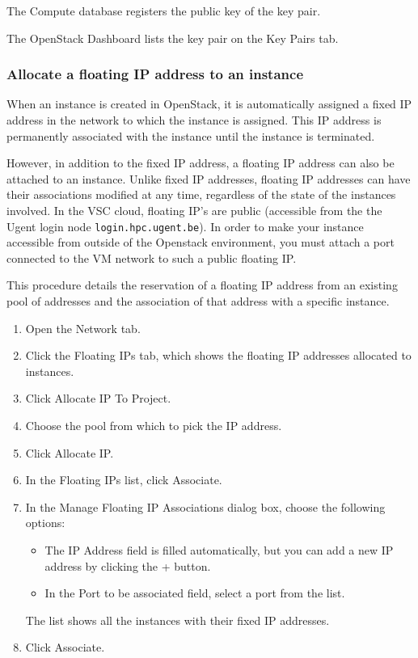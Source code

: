 The Compute database registers the public key of the key pair.

The \gls{OpenStack Dashboard} lists the key pair on the Key Pairs tab.

\subsubsection{Allocate a floating IP address to an instance}\label{allocate-a-floating-ip-address-to-an-instance}
When an instance is created in \gls{OpenStack}, it is automatically
assigned a fixed IP address in the network to which the instance is
assigned. This IP address is permanently associated with the instance
until the instance is terminated.

However, in addition to the fixed IP address, a floating IP address
can also be attached to an instance.  Unlike fixed IP addresses,
floating IP addresses can have their associations modified at any
time, regardless of the state of the instances involved.  In the VSC
cloud, floating IP's are public (accessible from the the Ugent login
node \lstinline{login.hpc.ugent.be}).  In order to make your instance
accessible from outside of the Openstack environment, you must attach
a port connected to the VM network to such a public floating IP.

This procedure details the reservation of a floating IP address from
an existing pool of addresses and the association of that address with
a specific instance.

\begin{enumerate}
\item Open the Network tab.
\item Click the Floating IPs tab, which shows the floating IP
  addresses allocated to instances.
\item Click Allocate IP To Project.
\item Choose the pool from which to pick the IP address.
\item Click Allocate IP.
\item In the Floating IPs list, click Associate.
\item In the Manage Floating IP Associations dialog box, choose the
  following options:

  \begin{itemize}
  \item The IP Address field is filled automatically, but you can add
    a new IP address by clicking the + button.
  \item In the Port to be associated field, select a port from the
    list.
  \end{itemize}

  The list shows all the instances with their fixed IP addresses.
\item Click Associate.
\end{enumerate}

